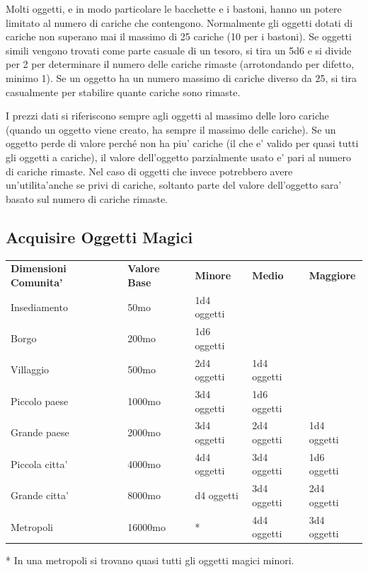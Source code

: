 \documentclass[a4paper,11pt,twoside,openany]{book}
\begin{document}
{		\label{cariche-dosi-e-usi-multipli}
		
		Molti oggetti, e in modo particolare le bacchette e i bastoni, hanno un potere limitato al numero di cariche che contengono. Normalmente gli oggetti dotati di cariche non superano mai il massimo di 25 cariche (10 per i bastoni). Se oggetti simili vengono trovati come parte casuale di un tesoro, si tira un 5d6 e si divide per 2 per determinare il numero delle cariche rimaste (arrotondando per difetto, minimo 1). Se un oggetto ha un numero massimo di cariche diverso da 25, si tira casualmente per stabilire quante cariche sono rimaste.
		
		I prezzi dati si riferiscono sempre agli oggetti al massimo delle loro cariche (quando un oggetto viene creato, ha sempre il massimo delle cariche). Se un oggetto perde di valore perché non ha piu' cariche (il che e' valido per quasi tutti gli oggetti a cariche), il valore dell'oggetto parzialmente usato e' pari al numero di cariche rimaste. Nel caso di oggetti che invece potrebbero avere un'utilita'anche se privi di cariche, soltanto parte del valore dell'oggetto sara' basato sul numero di cariche rimaste.
		
		
		\subsection{Acquisire Oggetti Magici}
		
		\label{acquisire-oggetti-magici}
		
		\bigskip
		
		\begin{tabular}{lllll}
			\toprule 
			\textbf{Dimensioni Comunita'} & \textbf{Valore Base} & \textbf{Minore} & \textbf{Medio} & \textbf{Maggiore}\tabularnewline
			Insediamento & 50mo & 1d4 oggetti & & \tabularnewline
			Borgo & 200mo & 1d6 oggetti & & \tabularnewline
			Villaggio & 500mo & 2d4 oggetti & 1d4 oggetti & \tabularnewline
			Piccolo paese & 1000mo & 3d4 oggetti & 1d6 oggetti & \tabularnewline
			Grande paese & 2000mo & 3d4 oggetti & 2d4 oggetti & 1d4 oggetti\tabularnewline
			Piccola citta' & 4000mo & 4d4 oggetti & 3d4 oggetti & 1d6 oggetti\tabularnewline
			Grande citta' & 8000mo & d4 oggetti & 3d4 oggetti & 2d4 oggetti\tabularnewline
			Metropoli & 16000mo & {*} & 4d4 oggetti & 3d4 oggetti\tabularnewline
		\end{tabular}
		
		{*} In una metropoli si trovano quasi tutti gli oggetti magici minori.
		
}
\end{document}
